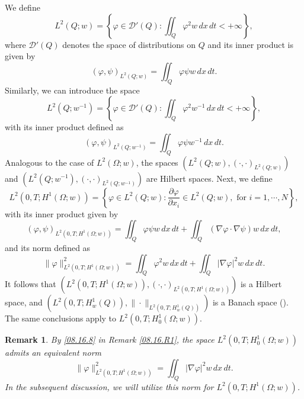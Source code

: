 \documentclass[11pt]{article}
\newtheorem{remark}{Remark}[section]
\numberwithin{equation}{section}
\begin{document}
 We define
\begin{equation*}
L^2(Q; w) = \left\{\varphi \in \mathcal{D}'(Q) \colon \iint_Q \varphi^2 w \, dx \, dt < +\infty\right\},
\end{equation*}
where $\mathcal{D}'(Q)$ denotes the space of distributions on $Q$   and its inner product is given by
\begin{equation*}
(\varphi, \psi)_{L^2(Q; w)} = \iint_Q \varphi \psi w \, dx \, dt.
\end{equation*}
 Similarly, we can introduce the space
\begin{equation*}
L^2(Q; w^{-1}) = \left\{\varphi \in \mathcal{D}'(Q) \colon \iint_Q \varphi^2 w^{-1} \, dx \, dt < +\infty\right\},
\end{equation*}
with its inner product defined as
\begin{equation*}
(\varphi, \psi)_{L^2(Q; w^{-1})} = \iint_Q \varphi \psi w^{-1} \, dx \, dt.
\end{equation*}
Analogous to the case of $L^2(\Omega; w)$, the spaces $(L^2(Q; w), (\cdot, \cdot)_{L^2(Q; w)})$ and $(L^2(Q; w^{-1}), (\cdot, \cdot)_{L^2(Q; w^{-1})})$ are Hilbert spaces.
Next, we define
\begin{equation*}
L^2(0, T; H^1(\Omega; w)) = \left\{\varphi \in L^2(Q; w) \colon \frac{\partial \varphi}{\partial x_i} \in L^2(Q; w), \text{  for } i = 1, \cdots, N\right\},
\end{equation*}
with its inner product given by
\begin{equation*}
(\varphi, \psi)_{L^2(0, T; H^1(\Omega; w))} = \iint_Q \varphi \psi w \, dx \, dt + \iint_Q (\nabla \varphi \cdot \nabla \psi)w \, dx \, dt,
\end{equation*}
and its norm defined as
\begin{equation*}
\|\varphi\|_{L^2(0, T; H^1(\Omega; w))}^2 = \iint_Q \varphi^2 w \, dx \, dt + \iint_Q |\nabla \varphi|^2 w \, dx \, dt.
\end{equation*}
It follows that $(L^2(0, T; H^1(\Omega; w)), (\cdot, \cdot)_{L^2(0, T; H^1(\Omega; w))})$ is a Hilbert space, and $(L^2(0, T; H_w^1(Q)), \|\cdot\|_{L^2(0, T; H_w^1(Q))})$ is a Banach space (\cite[section 3]{FF}). The same conclusions apply to $L^2(0, T; H_0^1(\Omega; w))$.
\begin{remark}
By \eqref{08.16.8} in Remark \ref{08.16.R1}, the space $L^2(0, T; H_0^1(\Omega; w))$ admits an equivalent norm
\begin{equation*}
\|\varphi\|_{L^2(0, T; H^1(\Omega; w))}^2 = \iint_Q |\nabla \varphi|^2 w \, dx \, dt.
\end{equation*}
In the subsequent discussion, we will utilize this norm for $L^2(0, T; H^1(\Omega; w))$.
\end{remark}
\end{document}
